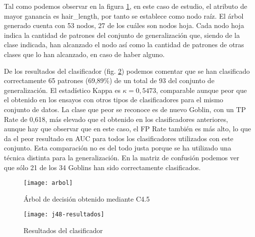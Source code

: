 Tal como podemos observar en la figura \ref{fig:j48-arbol}, en este caso de estudio, el atributo de mayor ganancia es hair\_length, por tanto se establece como nodo raíz. El árbol generado cuenta con 53 nodos, 27 de los cuáles son nodos hoja. Cada nodo hoja indica la cantidad de patrones del conjunto de generalización que, siendo de la clase indicada, han alcanzado el nodo así como la cantidad de patrones de otras clases que lo han alcanzado, en caso de haber alguno.

De los resultados del clasificador (fig. \ref{fig:j48-resultados}) podemos comentar que se han clasificado correctamente 65 patrones (69,89\%) de un total de 93 del conjunto de generalización. El estadístico Kappa es $\kappa=0,5473$, comparable aunque peor que el obtenido en los ensayos con otros tipos de clasificadores para el mismo conjunto de datos. La clase que peor se reconoce es de nuevo Goblin, con un TP Rate de 0,618, más elevado que el obtenido en los clasificadores anteriores, aunque hay que observar que en este caso, el FP Rate también es más alto, lo que da el peor resultado en AUC para todos los clasificadores utilizados con este conjunto. Esta comparación no es del todo justa porque se ha utilizado una técnica distinta para la generalización. En la matriz de confusión podemos ver que sólo 21 de los 34 Goblins han sido correctamente clasificados.

\begin{landscape}
\begin{figure}[!h]
    \centering
    \texttt{[image: arbol]}
    \caption{Árbol de decisión obtenido mediante C4.5}
    \label{fig:j48-arbol}
\end{figure}
\end{landscape}

\begin{figure}[ht]
    \centering
    \texttt{[image: j48-resultados]}
    \caption{Resultados del clasificador }
    \label{fig:j48-resultados}
\end{figure}


\clearpage
